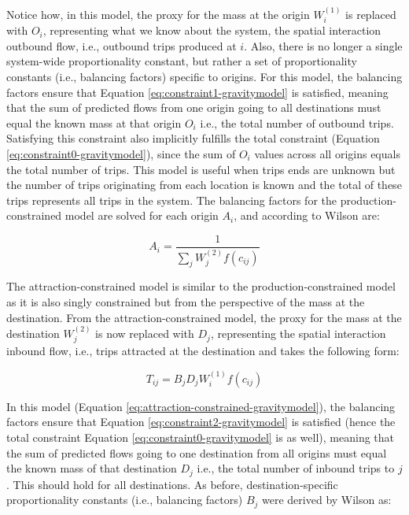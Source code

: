 \documentclass[
11pt, %
oneside, %
english, %
singlespacing, %
]{macthesis} %
\begin{document}
Notice how, in this model, the proxy for the mass at the origin \(W_i^{(1)}\) is replaced with \(O_i\), representing what we know about the system, the spatial interaction outbound flow, i.e., outbound trips produced at \(i\). Also, there is no longer a single system-wide proportionality constant, but rather a set of proportionality constants (i.e., balancing factors) specific to origins. For this model, the balancing factors ensure that Equation \ref{eq:constraint1-gravitymodel} is satisfied, meaning that the sum of predicted flows from one origin going to all destinations must equal the known mass at that origin \(O_i\) i.e., the total number of outbound trips. Satisfying this constraint also implicitly fulfills the total constraint (Equation \ref{eq:constraint0-gravitymodel}), since the sum of \(O_i\) values across all origins equals the total number of trips. This model is useful when trips ends are unknown but the number of trips originating from each location is known and the total of these trips represents all trips in the system. The balancing factors for the production-constrained model are solved for each origin \(A_i\), and according to Wilson are:

\begin{equation}
\label{eq:production-constrained-balancing-factor}
A_i = \frac{1}{\sum_j W_j^{(2)} f(c_{ij})}
\end{equation} 

The attraction-constrained model is similar to the production-constrained model as it is also singly constrained but from the perspective of the mass at the destination. From the attraction-constrained model, the proxy for the mass at the destination \(W_j^{(2)}\) is now replaced with \(D_j\), representing the spatial interaction inbound flow, i.e., trips attracted at the destination and takes the following form:

\begin{equation}
\label{eq:attraction-constrained-gravitymodel}
T_{ij} = B_j D_j W_i^{(1)} f(c_{ij})
\end{equation} 

In this model (Equation \ref{eq:attraction-constrained-gravitymodel}), the balancing factors ensure that Equation \ref{eq:constraint2-gravitymodel} is satisfied (hence the total constraint Equation \ref{eq:constraint0-gravitymodel} is as well), meaning that the sum of predicted flows going to one destination from all origins must equal the known mass of that destination \(D_j\) i.e., the total number of inbound trips to \(j\). This should hold for all destinations. As before, destination-specific proportionality constants (i.e., balancing factors) \(B_j\) were derived by Wilson as:
\end{document}
